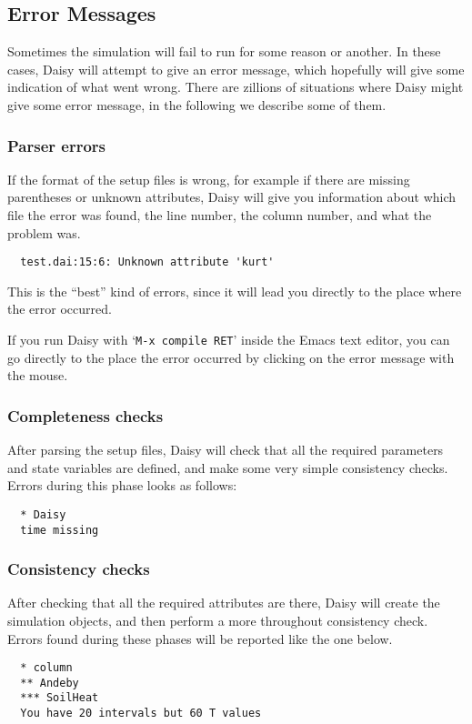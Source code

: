 \subsection{Error Messages}

Sometimes the simulation will fail to run for some reason or another.
In these cases, Daisy will attempt to give an error message, which
hopefully will give some indication of what went wrong.  There are
zillions of situations where Daisy might give some error message, in
the following we describe some of them.

\subsubsection{Parser errors}

If the format of the setup files is wrong, for example if there are
missing parentheses or unknown attributes, Daisy will give you
information about which file the error was found, the line number, the
column number, and what the problem was.
\begin{verbatim}
  test.dai:15:6: Unknown attribute 'kurt'
\end{verbatim}
This is the ``best'' kind of errors, since it will lead you directly
to the place where the error occurred.  

If you run Daisy with `\texttt{M-x~compile~RET}' inside the Emacs
text editor, you can go directly to the place the error occurred by
clicking on the error message with the mouse.

\subsubsection{Completeness checks}

After parsing the setup files, Daisy will check that all the required
parameters and state variables are defined, and make some very simple
consistency checks.  Errors during this phase looks as follows:
\begin{verbatim}
  * Daisy
  time missing
\end{verbatim}

\subsubsection{Consistency checks}

After checking that all the required attributes are there, Daisy will
create the simulation objects, and then perform a more throughout
consistency check.  Errors found during these phases will be reported
like the one below.
\begin{verbatim}
  * column
  ** Andeby
  *** SoilHeat
  You have 20 intervals but 60 T values
\end{verbatim}

